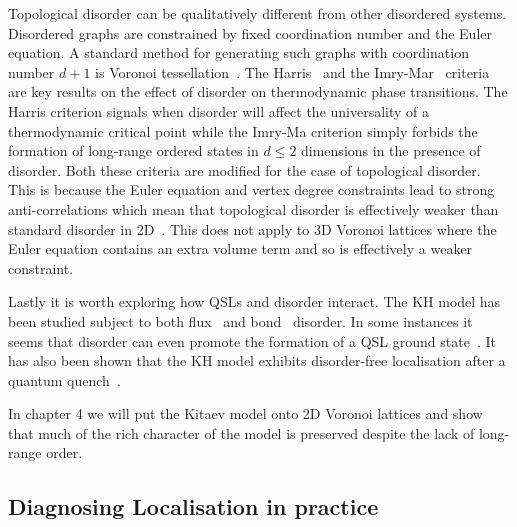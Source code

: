 Topological disorder can be qualitatively different from other disordered systems. Disordered graphs are constrained by fixed coordination number and the Euler equation. A standard method for generating such graphs with coordination number \(d+1\) is Voronoi tessellation~\autocite{mitchellAmorphousTopologicalInsulators2018,marsalTopologicalWeaireThorpeModels2020}. The Harris~\autocite{harrisEffectRandomDefects1974} and the Imry-Mar~\autocite{imryRandomFieldInstabilityOrdered1975} criteria are key results on the effect of disorder on thermodynamic phase transitions. The Harris criterion signals when disorder will affect the universality of a thermodynamic critical point while the Imry-Ma criterion simply forbids the formation of long-range ordered states in \(d \leq 2\) dimensions in the presence of disorder. Both these criteria are modified for the case of topological disorder. This is because the Euler equation and vertex degree constraints lead to strong anti-correlations which mean that topological disorder is effectively weaker than standard disorder in 2D~\autocite{barghathiPhaseTransitionsRandom2014,schrauthViolationHarrisBarghathiVojtaCriterion2018}. This does not apply to 3D Voronoi lattices where the Euler equation contains an extra volume term and so is effectively a weaker constraint.

Lastly it is worth exploring how QSLs and disorder interact. The KH model has been studied subject to both flux~\autocite{Nasu_Thermal_2015} and bond~\autocite{knolle_dynamics_2016} disorder. In some instances it seems that disorder can even promote the formation of a QSL ground state~\autocite{wenDisorderedRouteCoulomb2017}. It has also been shown that the KH model exhibits disorder-free localisation after a quantum quench~\autocite{zhuSubdiffusiveDynamicsCritical2021}.

In chapter 4 we will put the Kitaev model onto 2D Voronoi lattices and show that much of the rich character of the model is preserved despite the lack of long-range order.

\hypertarget{diagnosing-localisation-in-practice}{%
\subsection{Diagnosing Localisation in practice}\label{diagnosing-localisation-in-practice}}

